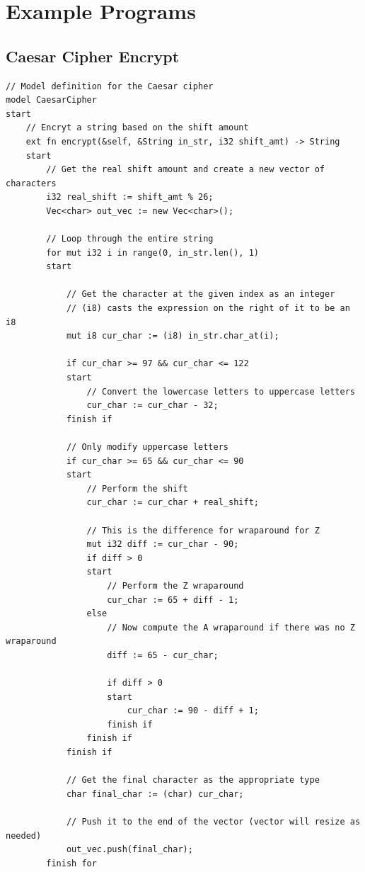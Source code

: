 \documentclass[letterpaper, 10pt, DIV=13]{scrartcl}
\numberwithin{equation}{section}
\numberwithin{figure}{section}
\numberwithin{table}{section}
\begin{document}
\section{Example Programs}
\subsection{Caesar Cipher Encrypt}
\begin{lstlisting}[caption = CaesarCipher.rez, frame = single, nolol]
// Model definition for the Caesar cipher
model CaesarCipher
start
    // Encryt a string based on the shift amount
    ext fn encrypt(&self, &String in_str, i32 shift_amt) -> String
    start
        // Get the real shift amount and create a new vector of characters
        i32 real_shift := shift_amt % 26;
        Vec<char> out_vec := new Vec<char>();

        // Loop through the entire string
        for mut i32 i in range(0, in_str.len(), 1)
        start
            
            // Get the character at the given index as an integer
            // (i8) casts the expression on the right of it to be an i8
            mut i8 cur_char := (i8) in_str.char_at(i);

            if cur_char >= 97 && cur_char <= 122
            start
                // Convert the lowercase letters to uppercase letters
                cur_char := cur_char - 32;
            finish if

            // Only modify uppercase letters
            if cur_char >= 65 && cur_char <= 90
            start
                // Perform the shift
                cur_char := cur_char + real_shift;

                // This is the difference for wraparound for Z
                mut i32 diff := cur_char - 90;
                if diff > 0
                start
                    // Perform the Z wraparound
                    cur_char := 65 + diff - 1;
                else
                    // Now compute the A wraparound if there was no Z wraparound
                    diff := 65 - cur_char;

                    if diff > 0
                    start
                        cur_char := 90 - diff + 1;
                    finish if
                finish if
            finish if
            
            // Get the final character as the appropriate type
            char final_char := (char) cur_char;

            // Push it to the end of the vector (vector will resize as needed)
            out_vec.push(final_char);
        finish for


\end{lstlisting}
\end{document}
